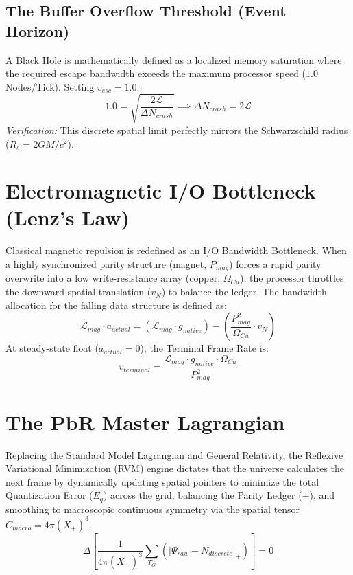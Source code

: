 \documentclass[12pt, a4paper]{article}
\begin{document}
\subsection{The Buffer Overflow Threshold (Event Horizon)}
A Black Hole is mathematically defined as a localized memory saturation where the required escape bandwidth exceeds the maximum processor speed ($1.0$ Nodes/Tick). Setting $v_{esc} = 1.0$:
\begin{equation}
    1.0 = \sqrt{\frac{2\mathcal{L}}{\Delta N_{crash}}} \implies \Delta N_{crash} = 2\mathcal{L}
\end{equation}
\textit{Verification:} This discrete spatial limit perfectly mirrors the Schwarzschild radius ($R_s = 2GM/c^2$).
\section{Electromagnetic I/O Bottleneck (Lenz's Law)}
Classical magnetic repulsion is redefined as an I/O Bandwidth Bottleneck. When a highly synchronized parity structure (magnet, $P_{mag}$) forces a rapid parity overwrite into a low write-resistance array (copper, $\Omega_{Cu}$), the processor throttles the downward spatial translation ($v_N$) to balance the ledger.
The bandwidth allocation for the falling data structure is defined as:
\begin{equation}
    \mathcal{L}_{mag} \cdot a_{actual} = (\mathcal{L}_{mag} \cdot g_{native}) - \left( \frac{P_{mag}^2}{\Omega_{Cu}} \cdot v_N \right)
\end{equation}
At steady-state float ($a_{actual} = 0$), the Terminal Frame Rate is:
\begin{equation}
    v_{terminal} = \frac{\mathcal{L}_{mag} \cdot g_{native} \cdot \Omega_{Cu}}{P_{mag}^2}
\end{equation}
\section{The PbR Master Lagrangian}
Replacing the Standard Model Lagrangian and General Relativity, the Reflexive Variational Minimization (RVM) engine dictates that the universe calculates the next frame by dynamically updating spatial pointers to minimize the total Quantization Error ($E_q$) across the grid, balancing the Parity Ledger ($\pm$), and smoothing to macroscopic continuous symmetry via the spatial tensor $\hat{C}_{macro} = 4\pi (X_+)^3$.
\begin{equation}
    \Delta \left[ \frac{1}{4\pi (X_+)^3} \sum_{T_G} \left( |\Psi_{raw} - N_{discrete}|_{\pm} \right) \right] = 0
\end{equation}
\appendix
\end{document}
